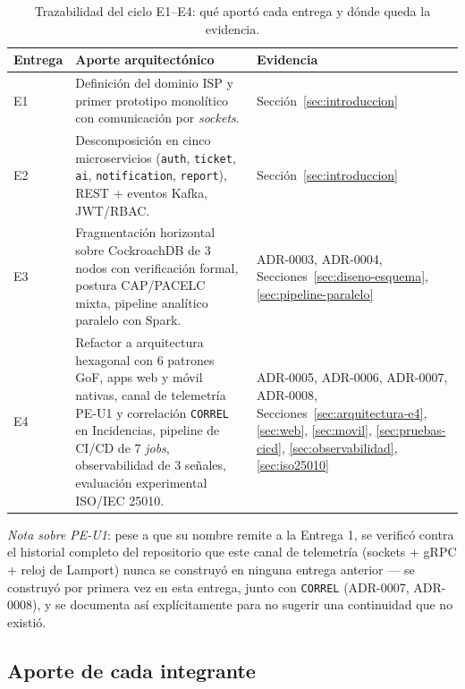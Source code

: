 \begin{table}[H]
\centering
\small
\caption{Trazabilidad del ciclo E1--E4: qué aportó cada entrega y dónde queda la evidencia.}
\label{tab:trazabilidad-e1-e4}
\begin{tabular}{@{}p{1.1cm}p{6.4cm}p{5.6cm}@{}}
\toprule
\textbf{Entrega} & \textbf{Aporte arquitectónico} & \textbf{Evidencia} \\
\midrule
E1 & Definición del dominio ISP y primer prototipo monolítico con comunicación por
     \emph{sockets}. & Sección~\ref{sec:introduccion} \\
E2 & Descomposición en cinco microservicios (\texttt{auth}, \texttt{ticket}, \texttt{ai},
     \texttt{notification}, \texttt{report}), REST + eventos Kafka, JWT/RBAC. &
     Sección~\ref{sec:introduccion} \\
E3 & Fragmentación horizontal sobre CockroachDB de 3 nodos con verificación formal, postura
     CAP/PACELC mixta, pipeline analítico paralelo con Spark. & ADR-0003, ADR-0004,
     Secciones~\ref{sec:diseno-esquema}, \ref{sec:pipeline-paralelo} \\
E4 & Refactor a arquitectura hexagonal con 6 patrones GoF, apps web y móvil nativas, canal de
     telemetría PE-U1 y correlación \texttt{CORREL} en Incidencias, pipeline de CI/CD de 7
     \emph{jobs}, observabilidad de 3 señales, evaluación experimental ISO/IEC 25010. &
     ADR-0005, ADR-0006, ADR-0007, ADR-0008, Secciones~\ref{sec:arquitectura-e4},
     \ref{sec:web}, \ref{sec:movil}, \ref{sec:pruebas-cicd}, \ref{sec:observabilidad},
     \ref{sec:iso25010} \\
\bottomrule
\end{tabular}
\end{table}

\emph{Nota sobre PE-U1}: pese a que su nombre remite a la Entrega 1, se verificó contra el
historial completo del repositorio que este canal de telemetría (sockets + gRPC + reloj de
Lamport) nunca se construyó en ninguna entrega anterior --- se construyó por primera vez en esta
entrega, junto con \texttt{CORREL} (ADR-0007, ADR-0008), y se documenta así explícitamente para
no sugerir una continuidad que no existió.

\subsection{Aporte de cada integrante}
\label{sec:aporte-integrantes}

